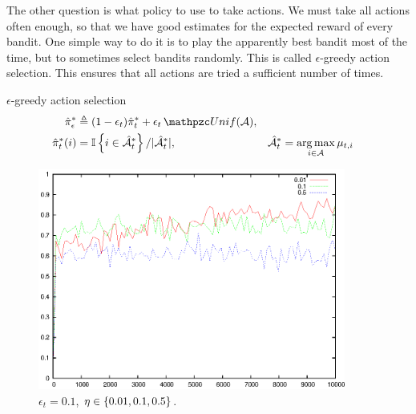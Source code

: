 \begin{frame}
{    The other question is what policy to use to take actions. We must take all actions often enough, so that we have good estimates for the expected reward of every bandit. One simple way to do it is to play the apparently best bandit most of the time, but to sometimes select bandits randomly. This is called $\epsilon$-greedy action selection. This ensures that all actions are tried a sufficient number of times.
  }
  \begin{definition}{$\epsilon$-greedy action selection}
    \begin{align}
      \hat{\pi}^*_\epsilon &\defn (1 - \epsilon_t) \hat{\pi}^*_t + \epsilon_t \Uniform(\CA),
      \\
      \hat{\pi}^*_t(i) &= \ind{i \in \hat{\CA}^*_t}/|\hat{\CA}^*_t|,
                       &
                         \hat{\CA}^*_t &= \argmax_{i \in \CA} \mu_{t,i}
                                         \label{eq:eps-greedy}
    \end{align}
  \end{definition}
\end{frame}

\begin{frame}
  \begin{figure}[H]
    \centering
    \includegraphics[width=0.9\textwidth]{../figures/bandit_fixed_epsilon}
    \caption{$\epsilon_t = 0.1$, $\eta \in \{0.01, 0.1, 0.5\}$.}
    \label{fig:bandit-fixed-epsilon}
  \end{figure}
\end{frame}

